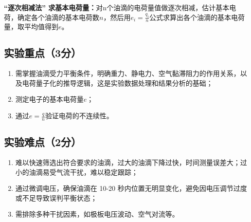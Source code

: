 \documentclass[]{../../templates/Report}%
\begin{document}
\vspace{2mm}
\textbf{“逐次相减法” 求基本电荷量：}对n个油滴的电荷量值做逐次相减，估计基本电荷，确定各个油滴的基本电荷数$n$，然后用\(e_i = \frac{q_i}{n}\)公式求算出各个油滴的基本电荷量，取平均值得到$e$。

\subsection{实验重点（3分）}
\begin{enumerate}
    \item 需掌握油滴受力平衡条件，明确重力、静电力、空气黏滞阻力的作用关系，以及电荷量子化的推导逻辑，这是实验数据处理和结果分析的基础；
    \item 测定电子的基本电荷量$e$；
    \item 通过\(e = \frac{q}{n}\)验证电荷的不连续性。
\end{enumerate}

\subsection{实验难点（2分）}
\begin{enumerate}
    \item 难以快速筛选出符合要求的油滴，过大的油滴下降过快，时间测量误差大；过小的油滴易受气流干扰，难以稳定跟踪；
    \item 通过微调电压，确保油滴在 10-20 秒内位置无明显变化，避免因电压调节过度或不足导致误判平衡状态；
    \item 需排除多种干扰因素，如极板电压波动、空气对流等。
\end{enumerate}
\end{document}
